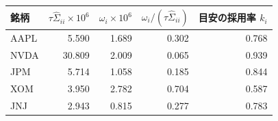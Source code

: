 \begin{tabular}{lrrrr}
\toprule
銘柄 & $\tau\hat\Sigma_{ii} \times 10^6$ & $\omega_i \times 10^6$ & $\omega_i / (\tau\hat\Sigma_{ii})$ & 目安の採用率 $k_i$ \\
\midrule
AAPL & 5.590 & 1.689 & 0.302 & 0.768 \\
NVDA & 30.809 & 2.009 & 0.065 & 0.939 \\
JPM & 5.714 & 1.058 & 0.185 & 0.844 \\
XOM & 3.950 & 2.782 & 0.704 & 0.587 \\
JNJ & 2.943 & 0.815 & 0.277 & 0.783 \\
\bottomrule
\end{tabular}
